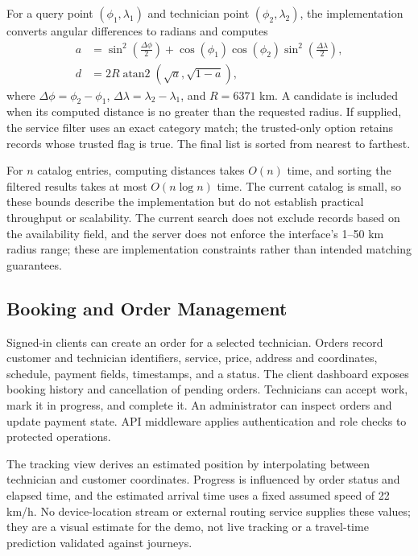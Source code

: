 \documentclass[conference]{IEEEtran}
\begin{document}
For a query point $(\phi_1,\lambda_1)$ and technician point $(\phi_2,\lambda_2)$, the implementation converts angular differences to radians and computes
\begin{align}
 a &= \sin^2\left(\frac{\Delta\phi}{2}\right)
 + \cos(\phi_1)\cos(\phi_2)
   \sin^2\left(\frac{\Delta\lambda}{2}\right),\\
 d &= 2R\operatorname{atan2}\left(\sqrt{a},\sqrt{1-a}\right),
\end{align}
where $\Delta\phi=\phi_2-\phi_1$, $\Delta\lambda=\lambda_2-\lambda_1$, and $R=6371$ km. A candidate is included when its computed distance is no greater than the requested radius. If supplied, the service filter uses an exact category match; the trusted-only option retains records whose trusted flag is true. The final list is sorted from nearest to farthest.

For $n$ catalog entries, computing distances takes $O(n)$ time, and sorting the filtered results takes at most $O(n\log n)$ time. The current catalog is small, so these bounds describe the implementation but do not establish practical throughput or scalability. The current search does not exclude records based on the availability field, and the server does not enforce the interface's 1--50 km radius range; these are implementation constraints rather than intended matching guarantees.

\subsection{Booking and Order Management}
Signed-in clients can create an order for a selected technician. Orders record customer and technician identifiers, service, price, address and coordinates, schedule, payment fields, timestamps, and a status. The client dashboard exposes booking history and cancellation of pending orders. Technicians can accept work, mark it in progress, and complete it. An administrator can inspect orders and update payment state. API middleware applies authentication and role checks to protected operations.

The tracking view derives an estimated position by interpolating between technician and customer coordinates. Progress is influenced by order status and elapsed time, and the estimated arrival time uses a fixed assumed speed of 22 km/h. No device-location stream or external routing service supplies these values; they are a visual estimate for the demo, not live tracking or a travel-time prediction validated against journeys.
\end{document}
